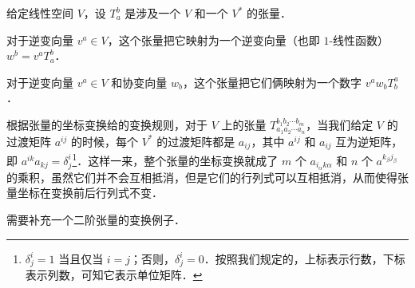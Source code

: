 \begin{example}{}
给定线性空间 $V$，设 $T^b_a$ 是涉及一个 $V$ 和一个 $V^*$ 的张量．

对于逆变向量 $v^a\in V$，这个张量把它映射为一个逆变向量（也即 $1$-线性函数）$w^b=v^aT^b_a$．

对于逆变向量 $v^a\in V$ 和协变向量 $w_b$，这个张量把它们俩映射为一个数字 $v^aw_bT^a_b$．
\end{example}

根据张量的坐标变换给的变换规则，对于 $V$ 上的张量 $T^{b_1b_2\cdots b_m}_{a_1a_2\cdots a_n}$，当我们给定 $V$ 的过渡矩阵 $a^{ij}$ 的时候，每个 $V^*$ 的过渡矩阵都是 $a_{ij}$，其中 $a^{ij}$ 和 $a_{ij}$ 互为逆矩阵，即 $a^{ik}a_{kj}=\delta^i_j$\footnote{$\delta^i_j=1$ 当且仅当 $i=j$；否则，$\delta^i_j=0$．按照我们规定的，上标表示行数，下标表示列数，可知它表示单位矩阵．}．这样一来，整个张量的坐标变换就成了 $m$ 个 $a_{i_\alpha k\alpha}$ 和 $n$ 个 $a^{k_\beta j_\beta}$ 的乘积，虽然它们并不会互相抵消，但是它们的行列式可以互相抵消，从而使得张量坐标在变换前后行列式不变．


\begin{issues}
需要补充一个二阶张量的变换例子．
\end{issues}
















